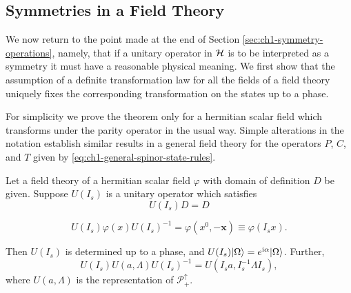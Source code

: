 \subsection{Symmetries in a Field Theory}
\label{sec:ch3-symmetries}

We now return to the point made at the end of Section \ref{sec:ch1-symmetry-operations}, namely, that if a
unitary operator in $\mathcal{H}$ is to be interpreted as a symmetry it must have
a reasonable physical meaning.  We first show that the assumption of a
definite transformation law for all the fields of a field theory uniquely
fixes the corresponding transformation on the states up to a phase.

For simplicity we prove the theorem only for a hermitian scalar field which
transforms under the parity operator in the usual way.  Simple alterations in
the notation establish similar results in a general field theory for the
operators $P$, $C$, and $T$ given by \eqref{eq:ch1-general-spinor-state-rules}.

\begin{theorem}[3-8]\label{thm:ch3-symmetry-uniqueness}
Let a field theory of a hermitian scalar field $\varphi$ with domain of
definition $D$ be given.  Suppose $U(I_s)$ is a unitary operator which
satisfies
\begin{equation*}
  U(I_s)D=D
\end{equation*}

\begin{equation}
  U(I_s)\varphi(x)U(I_s)^{-1}
  =\varphi(x^0,-\mathbf{x})\equiv\varphi(I_sx).
  \tag{3-58}\label{eq:ch3-symmetry-parity-field}
\end{equation}

Then $U(I_s)$ is determined up to a phase, and
$U(I_s)\lvert \Omega\rangle=e^{\mathrm{i}\alpha}\lvert \Omega\rangle$.  Further,
\begin{equation}
  U(I_s)U(a,\Lambda)U(I_s)^{-1}
  =U(I_sa,I_s^{-1}\Lambda I_s),
  \tag{3-59}\label{eq:ch3-symmetry-group-conjugation}
\end{equation}
where $U(a,\Lambda)$ is the representation of
$\mathcal{P}_+^\uparrow$.
\end{theorem}

